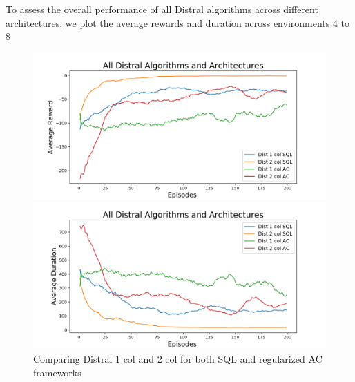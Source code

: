 \documentclass[12pt]{report}
\begin{document}
To assess the overall performance of all Distral algorithms across different architectures, we plot the average rewards and duration across environments 4 to 8

\begin{figure}[H]
\centering
\begin{minipage}{.5\textwidth}
\centering
\includegraphics[width=\textwidth]{figs/all_algos_rwd.png}
\end{minipage}%
\centering
\begin{minipage}{.5\textwidth}
\centering
\includegraphics[width=\textwidth]{figs/all_algos_dur.png}
\end{minipage}%
\caption{Comparing Distral 1 col and 2 col for both SQL and regularized AC frameworks}
\label{fig:all-algos}
\end{figure}
\end{document}
